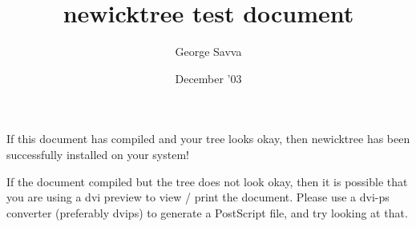 \documentclass{article}
\begin{document}
\title{\textsf{newicktree} test document}
\author{George Savva}
\date{December '03}
\maketitle

If this document has compiled and your tree looks okay, then \textsf{newicktree} has been successfully installed on your system!

If the document compiled but the tree does not look okay, then it is possible that you are using a dvi preview to view / print the document.  Please use a dvi-ps converter (preferably dvips) to generate a PostScript file, and try looking at that.

\begin{newicktree}
\end{newicktree}
\end{document}

